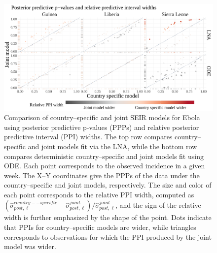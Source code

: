 \begin{figure}[htbp]
	\centering
	\includegraphics[width=0.85\linewidth]{figures/ebola_single_joint_ppicomp}
	\caption[Comparison of country--specific and joint SEIR Ebola models with posterior predictive p-values and relative predictive interval widths.]{Comparison of country--specific and joint SEIR models for Ebola using posterior predictive p-values (PPPs) and relative posterior predictive interval (PPI) widths. The top row compares country--specific and joint models fit via the LNA, while the bottom row compares deterministic country--specific and joint models fit using ODE. Each point corresponds to the observed incidence in a given week. The X--Y coordinates give the PPPs of the data under the country--specific and joint models, respectively. The size and color of each point corresponds to the relative PPI width, computed as $ (\widehat{\sigma}_{post,\ell}^{country--specific} - \widehat{\sigma}_{post,\ell}^{joint})/\widehat{\sigma}_{post,\ell}^{joint} $, and the sign of the relative width is further emphasized by the shape of the point. Dots indicate that PPIs for country--specific models are wider, while triangles corresponds to observations for which the PPI produced by the joint model was wider.}
	\label{fig:ebola_single_joint_ppicomp}
\end{figure}

